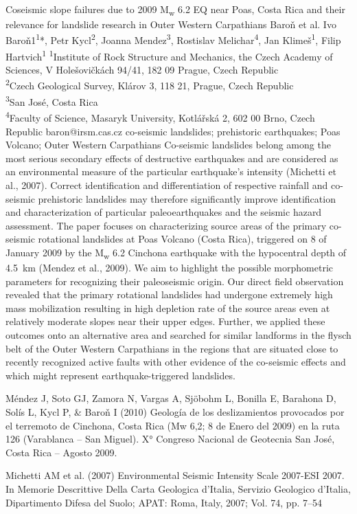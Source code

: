 \abstract
{Coseismic slope failures due to 2009 M\textsubscript{w} 6.2 EQ near Poas, Costa Rica and their relevance for landslide research in Outer Western Carpathians} 
{Baroň et al.} 
{Ivo Baroň1\textsuperscript{1}*, Petr Kycl\textsuperscript{2}, Joanna Mendez\textsuperscript{3}, Rostislav Melichar\textsuperscript{4}, Jan Klimeš\textsuperscript{1}, Filip Hartvich\textsuperscript{1}} 
{\TLtag} 
{
\textsuperscript{1}Institute of Rock Structure and Mechanics, the Czech Academy of Sciences, V Holešovičkách 94/41, 182 09 Prague, Czech Republic\\
\textsuperscript{2}Czech Geological Survey, Klárov 3, 118 21, Prague, Czech Republic\\
\textsuperscript{3}San José, Costa Rica\\
\textsuperscript{4}Faculty of Science, Masaryk University, Kotlářská 2, 602 00 Brno, Czech Republic
}
{baron@irsm.cas.cz}  %
{co-seismic landslides; prehistoric earthquakes; Poas Volcano; Outer Western Carpathians}
{Co-seismic landslides belong among the most serious secondary effects of destructive earthquakes and are considered as an environmental measure of the particular earthquake's intensity (Michetti et al., 2007). Correct identification and differentiation of respective rainfall and co-seismic prehistoric landslides may therefore significantly improve identification and characterization of particular paleoearthquakes and the seismic hazard assessment. The paper focuses on characterizing source areas of the primary co-seismic rotational landslides at Poas Volcano (Costa Rica), triggered on 8 of January 2009 by the M\textsubscript{w} 6.2 Cinchona earthquake with the hypocentral depth of 4.5~km (Mendez et al., 2009). We aim to highlight the possible morphometric parameters for recognizing their paleoseismic origin. Our direct field observation revealed that the primary rotational landslides had undergone extremely high mass mobilization resulting in high depletion rate of the source areas even at relatively moderate slopes near their upper edges. Further, we applied these outcomes onto an alternative area and searched for similar landforms in the flysch belt of the Outer Western Carpathians in the regions that are situated close to recently recognized active faults with other evidence of the co-seismic effects and which might represent earthquake-triggered landslides.
}
{Méndez J, Soto GJ, Zamora N, Vargas A, Sjöbohm L, Bonilla E, Barahona D, Solís L, Kycl P, \& Baroň I (2010) Geología de los deslizamientos provocados por el terremoto de Cinchona, Costa Rica (Mw 6,2; 8 de Enero del 2009) en la ruta 126 (Varablanca – San Miguel). X° Congreso Nacional de Geotecnia  San José, Costa Rica -- Agosto 2009.

Michetti AM et al. (2007) Environmental Seismic Intensity Scale 2007-ESI 2007. In Memorie Descrittive Della Carta Geologica d’Italia, Servizio Geologico d’Italia, Dipartimento Difesa del Suolo; APAT: Roma, Italy, 2007; Vol. 74, pp. 7--54
}


